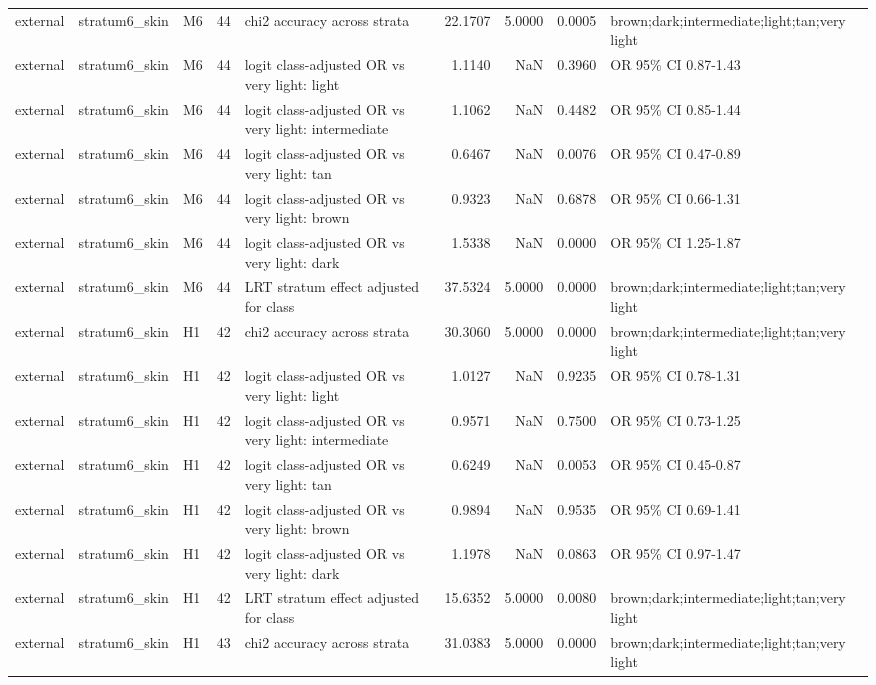 \begin{tabular}{lllrlrrrl}
external & stratum6\_skin & M6 & 44 & chi2 accuracy across strata & 22.1707 & 5.0000 & 0.0005 & brown;dark;intermediate;light;tan;very light \\
external & stratum6\_skin & M6 & 44 & logit class-adjusted OR vs very light: light & 1.1140 & NaN & 0.3960 & OR 95\% CI 0.87-1.43 \\
external & stratum6\_skin & M6 & 44 & logit class-adjusted OR vs very light: intermediate & 1.1062 & NaN & 0.4482 & OR 95\% CI 0.85-1.44 \\
external & stratum6\_skin & M6 & 44 & logit class-adjusted OR vs very light: tan & 0.6467 & NaN & 0.0076 & OR 95\% CI 0.47-0.89 \\
external & stratum6\_skin & M6 & 44 & logit class-adjusted OR vs very light: brown & 0.9323 & NaN & 0.6878 & OR 95\% CI 0.66-1.31 \\
external & stratum6\_skin & M6 & 44 & logit class-adjusted OR vs very light: dark & 1.5338 & NaN & 0.0000 & OR 95\% CI 1.25-1.87 \\
external & stratum6\_skin & M6 & 44 & LRT stratum effect adjusted for class & 37.5324 & 5.0000 & 0.0000 & brown;dark;intermediate;light;tan;very light \\
external & stratum6\_skin & H1 & 42 & chi2 accuracy across strata & 30.3060 & 5.0000 & 0.0000 & brown;dark;intermediate;light;tan;very light \\
external & stratum6\_skin & H1 & 42 & logit class-adjusted OR vs very light: light & 1.0127 & NaN & 0.9235 & OR 95\% CI 0.78-1.31 \\
external & stratum6\_skin & H1 & 42 & logit class-adjusted OR vs very light: intermediate & 0.9571 & NaN & 0.7500 & OR 95\% CI 0.73-1.25 \\
external & stratum6\_skin & H1 & 42 & logit class-adjusted OR vs very light: tan & 0.6249 & NaN & 0.0053 & OR 95\% CI 0.45-0.87 \\
external & stratum6\_skin & H1 & 42 & logit class-adjusted OR vs very light: brown & 0.9894 & NaN & 0.9535 & OR 95\% CI 0.69-1.41 \\
external & stratum6\_skin & H1 & 42 & logit class-adjusted OR vs very light: dark & 1.1978 & NaN & 0.0863 & OR 95\% CI 0.97-1.47 \\
external & stratum6\_skin & H1 & 42 & LRT stratum effect adjusted for class & 15.6352 & 5.0000 & 0.0080 & brown;dark;intermediate;light;tan;very light \\
external & stratum6\_skin & H1 & 43 & chi2 accuracy across strata & 31.0383 & 5.0000 & 0.0000 & brown;dark;intermediate;light;tan;very light \\

\end{tabular}
